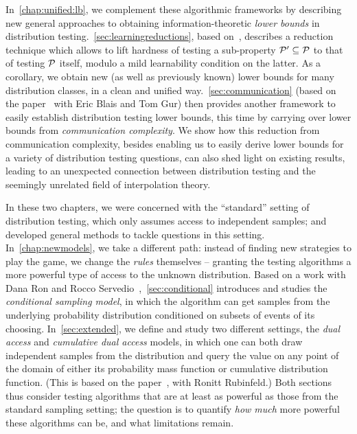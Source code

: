 In~\cref{chap:unified:lb}, we complement these algorithmic frameworks by describing new general approaches to obtaining information-theoretic \emph{lower bounds} in distribution testing.~\cref{sec:learningreductions}, based on~\cite{CDGR:16}, describes a reduction technique which allows to lift hardness of testing a sub-property $\mathcal{P}'\subseteq\mathcal{P}$ to that of testing $\mathcal{P}$ itself, modulo a mild learnability condition on the latter. As a corollary, we obtain new (as well as previously known) lower bounds for many distribution classes, in a clean and unified way.~\cref{sec:communication} (based on the paper~\cite{BCG:17} with Eric Blais and Tom Gur) then provides another framework  to easily establish distribution testing lower bounds, this time by carrying over lower bounds from \emph{communication complexity}. We show how this reduction from communication complexity, besides enabling us to easily derive lower bounds for a variety of distribution testing questions, can also shed light on existing results, leading to an unexpected connection between distribution testing and the seemingly unrelated field of interpolation theory.

In these two chapters, we were concerned with the ``standard'' setting of distribution testing, which only assumes access to independent samples; and developed general methods to tackle questions in this setting. In~\cref{chap:newmodels}, we take a different path: instead of finding new strategies to play the game, we change the \emph{rules} themselves -- granting the testing algorithms a more powerful type of access to the unknown distribution. Based on a work with Dana Ron and Rocco Servedio~\cite{CRS:15},~\cref{sec:conditional} introduces and studies the \emph{conditional sampling model}, in which the algorithm can get samples from the underlying probability distribution conditioned on subsets of events of its choosing. In~\cref{sec:extended}, we define and study two different settings, the \emph{dual access} and \emph{cumulative dual access} models, in which one can both draw independent samples from the distribution and query the value on any point of the domain of either its probability mass function or cumulative distribution function. (This is based on the paper~\cite{CR:14}, with Ronitt Rubinfeld.) Both sections thus consider testing algorithms that are at least as powerful as those from the standard sampling setting; the question is to quantify \emph{how much} more powerful these algorithms can be, and what limitations remain.

